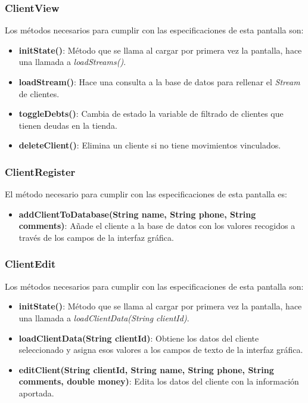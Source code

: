 \subsubsection{ClientView}

Los métodos necesarios para cumplir con las especificaciones de esta pantalla son:

\begin{itemize}
	\item \textbf{initState()}: Método que se llama al cargar por primera vez la pantalla, hace una llamada a \textit{loadStreams()}.
	\item \textbf{loadStream()}: Hace una consulta a la base de datos para rellenar el \textit{Stream} de clientes. 
	\item \textbf{toggleDebts()}: Cambia de estado la variable de filtrado de clientes que tienen deudas en la tienda. 
	\item \textbf{deleteClient()}: Elimina un cliente si no tiene movimientos vinculados. 
\end{itemize}

\subsubsection{ClientRegister}

El método necesario para cumplir con las especificaciones de esta pantalla es:

\begin{itemize}
	\item \textbf{addClientToDatabase(String name, String phone, String comments)}: Añade el cliente a la base de datos con los valores recogidos a través de los campos de la interfaz gráfica. 
\end{itemize}

\subsubsection{ClientEdit}

Los métodos necesarios para cumplir con las especificaciones de esta pantalla son:

\begin{itemize}
	\item \textbf{initState()}: Método que se llama al cargar por primera vez la pantalla, hace una llamada a \textit{loadClientData(String clientId)}.
	\item \textbf{loadClientData(String clientId)}: Obtiene los datos del cliente seleccionado y asigna esos valores a los campos de texto de la interfaz gráfica. 
	\item \textbf{editClient(String clientId, String name, String phone, String comments, double money)}: Edita los datos del cliente con la información aportada. 
\end{itemize}

